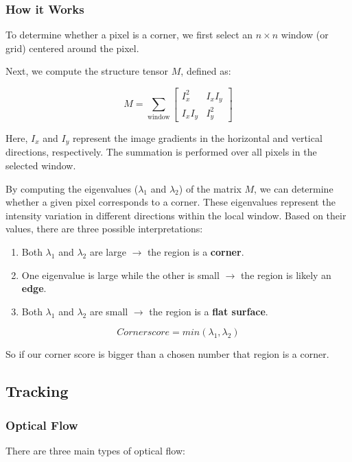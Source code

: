 \documentclass[a4paper,12pt]{article}
\begin{document}
\subsubsection{How it Works}

To determine whether a pixel is a corner, we first select an $n \times n$ window (or grid) centered around the pixel.

Next, we compute the structure tensor \( M \), defined as:

\[
M = \sum_{\text{window}} 
\begin{bmatrix}
I_x^2 & I_x I_y \\
I_x I_y & I_y^2
\end{bmatrix}
\]

Here, \( I_x \) and \( I_y \) represent the image gradients in the horizontal and vertical directions, respectively. The summation is performed over all pixels in the selected window.

By computing the eigenvalues (\( \lambda_1 \) and \( \lambda_2 \)) of the matrix \( M \), 
we can determine whether a given pixel corresponds to a corner. These eigenvalues represent the intensity variation in different directions within the local window. Based on their values, there are three possible interpretations:

\begin{enumerate}
    \item Both \( \lambda_1 \) and \( \lambda_2 \) are large \( \rightarrow \) the region is a \textbf{corner}.
    \item One eigenvalue is large while the other is small \( \rightarrow \) the region is likely an \textbf{edge}.
    \item Both \( \lambda_1 \) and \( \lambda_2 \) are small \( \rightarrow \) the region is a \textbf{flat surface}.
\end{enumerate}

\[Corner score = min( \lambda_1, \lambda_2)\]

So if our corner score is bigger than a chosen number that region is a corner.

\subsection{Tracking}

\subsubsection{Optical Flow}
There are three main types of optical flow:
\end{document}
